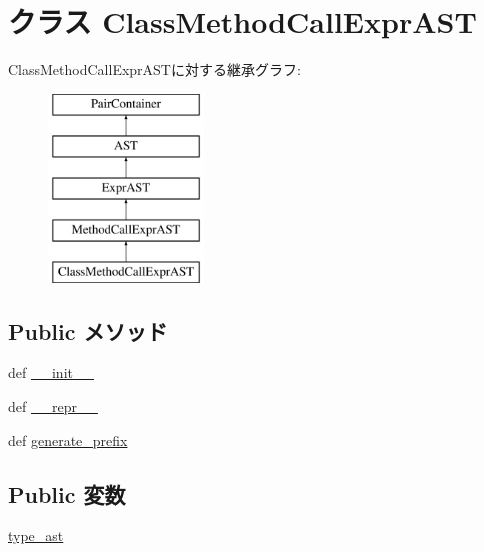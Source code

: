 \hypertarget{classslicc_1_1ast_1_1MethodCallExprAST_1_1ClassMethodCallExprAST}{
\section{クラス ClassMethodCallExprAST}
\label{classslicc_1_1ast_1_1MethodCallExprAST_1_1ClassMethodCallExprAST}
}
ClassMethodCallExprASTに対する継承グラフ:\begin{figure}[H]
\begin{center}
\leavevmode
\includegraphics[height=5cm]{classslicc_1_1ast_1_1MethodCallExprAST_1_1ClassMethodCallExprAST}
\end{center}
\end{figure}
\subsection*{Public メソッド}
\begin{DoxyCompactItemize}
\item 
def \hyperlink{classslicc_1_1ast_1_1MethodCallExprAST_1_1ClassMethodCallExprAST_ac775ee34451fdfa742b318538164070e}{\_\-\_\-init\_\-\_\-}
\item 
def \hyperlink{classslicc_1_1ast_1_1MethodCallExprAST_1_1ClassMethodCallExprAST_ad8b9328939df072e4740cd9a63189744}{\_\-\_\-repr\_\-\_\-}
\item 
def \hyperlink{classslicc_1_1ast_1_1MethodCallExprAST_1_1ClassMethodCallExprAST_a706f9a281c5b0d05f80923a37adfa48e}{generate\_\-prefix}
\end{DoxyCompactItemize}
\subsection*{Public 変数}
\begin{DoxyCompactItemize}
\item 
\hyperlink{classslicc_1_1ast_1_1MethodCallExprAST_1_1ClassMethodCallExprAST_a2c41e611550596541faa6f64ffecc139}{type\_\-ast}
\end{DoxyCompactItemize}


